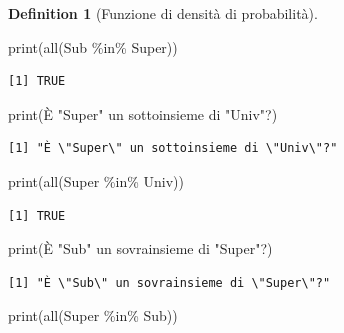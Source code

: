 \documentclass[
  letterpaper,
  DIV=11,
  numbers=noendperiod,
  oneside]{scrreprt}
\newenvironment{Shaded}{\begin{snugshade}}{\end{snugshade}}
\newcommand{\FunctionTok}[1]{\textcolor[rgb]{0.28,0.35,0.67}{#1}}
\newcommand{\NormalTok}[1]{\textcolor[rgb]{0.00,0.23,0.31}{#1}}
\newcommand{\SpecialCharTok}[1]{\textcolor[rgb]{0.37,0.37,0.37}{#1}}
\newcommand{\StringTok}[1]{\textcolor[rgb]{0.13,0.47,0.30}{#1}}
\theoremstyle{definition}
\theoremstyle{plain}
\theoremstyle{definition}
\newtheorem{definition}{Definition}[chapter]
\theoremstyle{remark}
\begin{document}
\begin{definition}[Funzione di densità di
probabilità]
\begin{Shaded}
\begin{Highlighting}[]
\FunctionTok{print}\NormalTok{(}\FunctionTok{all}\NormalTok{(Sub }\SpecialCharTok{\%in\%}\NormalTok{ Super))}
\end{Highlighting}
\end{Shaded}

\begin{verbatim}
[1] TRUE
\end{verbatim}

\begin{Shaded}
\begin{Highlighting}[]
\FunctionTok{print}\NormalTok{(}\StringTok{\textquotesingle{}È "Super" un sottoinsieme di "Univ"?\textquotesingle{}}\NormalTok{)}
\end{Highlighting}
\end{Shaded}

\begin{verbatim}
[1] "È \"Super\" un sottoinsieme di \"Univ\"?"
\end{verbatim}

\begin{Shaded}
\begin{Highlighting}[]
\FunctionTok{print}\NormalTok{(}\FunctionTok{all}\NormalTok{(Super }\SpecialCharTok{\%in\%}\NormalTok{ Univ))}
\end{Highlighting}
\end{Shaded}

\begin{verbatim}
[1] TRUE
\end{verbatim}

\begin{Shaded}
\begin{Highlighting}[]
\FunctionTok{print}\NormalTok{(}\StringTok{\textquotesingle{}È "Sub" un sovrainsieme di "Super"?\textquotesingle{}}\NormalTok{)}
\end{Highlighting}
\end{Shaded}

\begin{verbatim}
[1] "È \"Sub\" un sovrainsieme di \"Super\"?"
\end{verbatim}

\begin{Shaded}
\begin{Highlighting}[]
\FunctionTok{print}\NormalTok{(}\FunctionTok{all}\NormalTok{(Super }\SpecialCharTok{\%in\%}\NormalTok{ Sub))}
\end{Highlighting}
\end{Shaded}


\end{definition}
\end{document}
